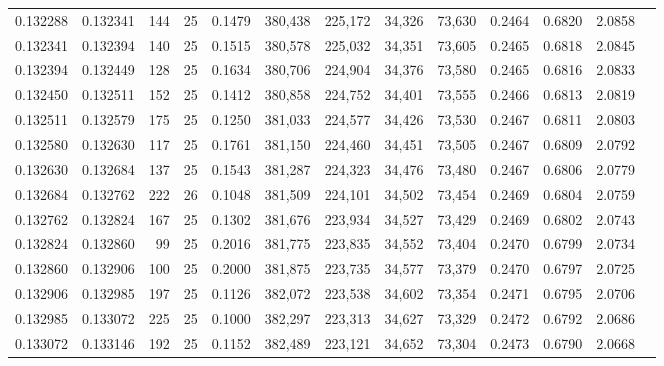\begin{tabular}{rrrrrrrrrrrrr}
0.132288 & 0.132341 &   144 &  25 &                                     0.1479 & 380,438 & 225,172 &  34,326 &  73,630 & 0.2464 & 0.6820 & 2.0858 \\
0.132341 & 0.132394 &   140 &  25 &                                     0.1515 & 380,578 & 225,032 &  34,351 &  73,605 & 0.2465 & 0.6818 & 2.0845 \\
0.132394 & 0.132449 &   128 &  25 &                                     0.1634 & 380,706 & 224,904 &  34,376 &  73,580 & 0.2465 & 0.6816 & 2.0833 \\
0.132450 & 0.132511 &   152 &  25 &                                     0.1412 & 380,858 & 224,752 &  34,401 &  73,555 & 0.2466 & 0.6813 & 2.0819 \\
0.132511 & 0.132579 &   175 &  25 &                                     0.1250 & 381,033 & 224,577 &  34,426 &  73,530 & 0.2467 & 0.6811 & 2.0803 \\
0.132580 & 0.132630 &   117 &  25 &                                     0.1761 & 381,150 & 224,460 &  34,451 &  73,505 & 0.2467 & 0.6809 & 2.0792 \\
0.132630 & 0.132684 &   137 &  25 &                                     0.1543 & 381,287 & 224,323 &  34,476 &  73,480 & 0.2467 & 0.6806 & 2.0779 \\
0.132684 & 0.132762 &   222 &  26 &                                     0.1048 & 381,509 & 224,101 &  34,502 &  73,454 & 0.2469 & 0.6804 & 2.0759 \\
0.132762 & 0.132824 &   167 &  25 &                                     0.1302 & 381,676 & 223,934 &  34,527 &  73,429 & 0.2469 & 0.6802 & 2.0743 \\
0.132824 & 0.132860 &    99 &  25 &                                     0.2016 & 381,775 & 223,835 &  34,552 &  73,404 & 0.2470 & 0.6799 & 2.0734 \\
0.132860 & 0.132906 &   100 &  25 &                                     0.2000 & 381,875 & 223,735 &  34,577 &  73,379 & 0.2470 & 0.6797 & 2.0725 \\
0.132906 & 0.132985 &   197 &  25 &                                     0.1126 & 382,072 & 223,538 &  34,602 &  73,354 & 0.2471 & 0.6795 & 2.0706 \\
0.132985 & 0.133072 &   225 &  25 &                                     0.1000 & 382,297 & 223,313 &  34,627 &  73,329 & 0.2472 & 0.6792 & 2.0686 \\
0.133072 & 0.133146 &   192 &  25 &                                     0.1152 & 382,489 & 223,121 &  34,652 &  73,304 & 0.2473 & 0.6790 & 2.0668 \\

\end{tabular}
